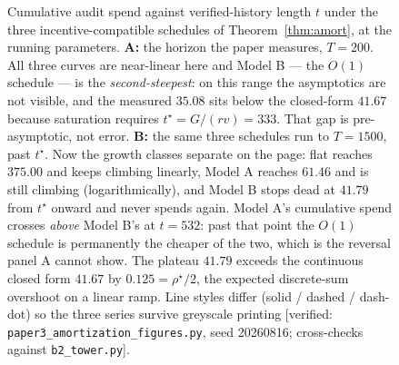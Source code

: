 \begin{figure}[htbp]
\caption{Cumulative audit spend against verified-history length $t$ under the three incentive-compatible schedules of Theorem~\ref{thm:amort}, at the running parameters. \textbf{A:} the horizon the paper measures, $T{=}200$. All three curves are near-linear here and Model B --- the $O(1)$ schedule --- is the \emph{second-steepest}: on this range the asymptotics are not visible, and the measured $35.08$ sits below the closed-form $41.67$ because saturation requires $t^\star = G/(rv) = 333$. That gap is pre-asymptotic, not error. \textbf{B:} the same three schedules run to $T{=}1500$, past $t^\star$. Now the growth classes separate on the page: flat reaches $375.00$ and keeps climbing linearly, Model A reaches $61.46$ and is still climbing (logarithmically), and Model B stops dead at $41.79$ from $t^\star$ onward and never spends again. Model A's cumulative spend crosses \emph{above} Model B's at $t{=}532$: past that point the $O(1)$ schedule is permanently the cheaper of the two, which is the reversal panel A cannot show. The plateau $41.79$ exceeds the continuous closed form $41.67$ by $0.125 = \rho^\star/2$, the expected discrete-sum overshoot on a linear ramp. Line styles differ (solid / dashed / dash-dot) so the three series survive greyscale printing [verified: \texttt{paper3\_amortization\_figures.py}, seed 20260816; cross-checks against \texttt{b2\_tower.py}].}
\label{fig:amort}
\end{figure}
